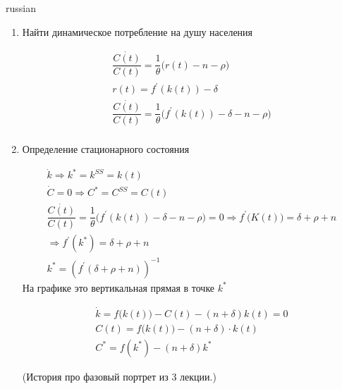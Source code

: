 \documentclass{article}
\begin{document}
\begin{otherlanguage*}{russian}
\begin{enumerate}
\item Найти динамическое потребление на душу населения 

\begin{align*}
\dfrac{\dot{C(t)}}{C(t)} = \dfrac{1}{\theta} \Big( r(t) - n - \rho \Big)\\
r(t) = f^{'} (k(t)) - \delta \\ 
\dfrac{\dot{C(t)}}{C(t)} = \dfrac{1}{\theta} \Big( f^{'} (k(t)) - \delta  - n - \rho \Big) \\
\end{align*}

\item Определение стационарного состояния

\begin{align*}
\dot{k} \Rightarrow k^* = k^{SS} = k(t) \\
\dot{C} = 0 \Rightarrow C^* = C^{SS} = C(t) \\
\dfrac{\dot{C(t)}}{C(t)} = \dfrac{1}{\theta} \Big( f^{'} (k(t)) - \delta  - n - \rho \Big) = 0 \Rightarrow f^{'} \Big( K(t) \Big) = \delta + \rho + n \\
\Rightarrow  f^{'} (k^*) = \delta + \rho + n \\
k^* = (f^{'} ( \delta + \rho + n) ) ^{-1}  
\end{align*}
На графике это вертикальная прямая в точке $ k^ * $ 

\begin{align*}
\dot{k} = f \Big( k(t) \Big) - C(t) - ( n +  \delta) k(t) = 0 \\
C(t) = f \Big( k(t) \Big) - ( n + \delta ) \cdot k(t) \\
C^* = f(k^*) - ( n + \delta ) k^* 
\end{align*}

(История про фазовый портрет из 3 лекции.) 


\end{enumerate}
\end{otherlanguage*}
\end{document}
